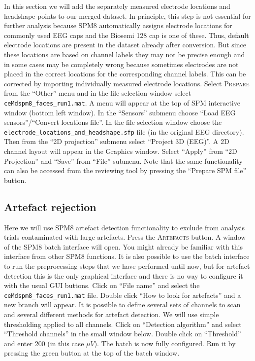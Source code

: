 In this section we will add the separately measured electrode locations and headshape points to our merged dataset. In principle, this step is not essential for further analysis because SPM8 automatically assigns electrode locations for commonly used EEG caps and the Biosemi 128 cap is one of these. Thus, default electrode locations are present in the dataset already after conversion. But since these locations are based on channel labels they may not be precise enough and in some cases may be completely wrong because sometimes electrodes are not placed in the correct locations for the corresponding channel labels. This can be corrected by importing individually measured electrode locations. Select \textsc{Prepare} from the ``Other'' menu and in the file selection window select \texttt{ceMdspm8\_faces\_run1.mat}. A menu will appear at the top of SPM interactive window (bottom left window). In the ``Sensors'' submenu choose ``Load EEG sensors''/``Convert locations file''. In the file selection window choose the \texttt{electrode\_locations\_and\_headshape.sfp} file (in the original EEG directory). Then from the ``2D projection'' submenu select ``Project 3D (EEG)''. A 2D channel layout will appear in the Graphics window. Select ``Apply'' from ``2D Projection'' and ``Save'' from ``File'' submenu. Note that the same functionality can also be accessed from the reviewing tool by pressing the ``Prepare SPM file'' button.

\subsection{Artefact rejection}

Here we will use SPM8 artefact detection functionality to exclude from analysis trials contaminated with large artefacts. Press the \textsc{Artefacts} button. A window of the SPM8 batch interface will open. You might already be familiar with this interface from other SPM8 functions. It is also possible to use the batch interface to run the preprocessing steps that we have performed until now, but for artefact detection this is the only graphical interface and there is no way to configure it with the usual GUI buttons. Click on ``File name'' and select the \texttt{ceMdspm8\_faces\_run1.mat} file.  Double click ``How to look for artefacts'' and a new branch will appear. It is possible to define several sets of channels to scan and several different methods for artefact detection. We will use simple thresholding applied to all channels. Click on ``Detection algorithm'' and select ``Threshold channels'' in the small window below. Double click on ``Threshold'' and enter 200 (in this case $\mu V$). The batch is now fully configured. Run it by pressing the green button at the top of the batch window.

